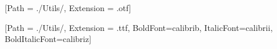 




\setmainfont{AvenirLTStd-Roman}[Path = ./Utils/, Extension = .otf]




\setmainfont{calibri-regular}[Path = ./Utils/, Extension = .ttf, BoldFont=calibrib, ItalicFont=calibrii, BoldItalicFont=calibriz]


\MyIndex

\hypersetup{linkcolor=AzulInfo}

\newpage






